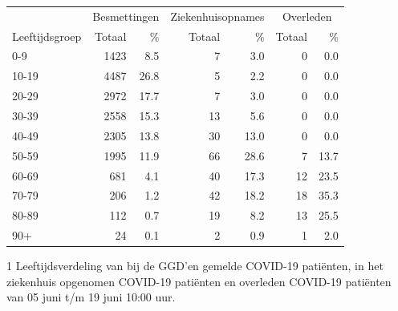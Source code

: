 \documentclass[
  english,
  man,floatsintext]{apa6}
\begin{document}
\begin{table}
\centering\begingroup\fontsize{11}{13}\selectfont

\begin{threeparttable}
\begin{tabular}{lrrrrrr}
\toprule
\multicolumn{1}{c}{ } & \multicolumn{2}{c}{Besmettingen} & \multicolumn{2}{c}{Ziekenhuisopnames} & \multicolumn{2}{c}{Overleden} \\
\cmidrule(l{3pt}r{3pt}){2-3} \cmidrule(l{3pt}r{3pt}){4-5} \cmidrule(l{3pt}r{3pt}){6-7}
Leeftijdsgroep & Totaal & \% & Totaal & \% & Totaal & \%\\
\midrule
0-9 & 1423 & 8.5 & 7 & 3.0 & 0 & 0.0\\
10-19 & 4487 & 26.8 & 5 & 2.2 & 0 & 0.0\\
20-29 & 2972 & 17.7 & 7 & 3.0 & 0 & 0.0\\
30-39 & 2558 & 15.3 & 13 & 5.6 & 0 & 0.0\\
40-49 & 2305 & 13.8 & 30 & 13.0 & 0 & 0.0\\
50-59 & 1995 & 11.9 & 66 & 28.6 & 7 & 13.7\\
60-69 & 681 & 4.1 & 40 & 17.3 & 12 & 23.5\\
70-79 & 206 & 1.2 & 42 & 18.2 & 18 & 35.3\\
80-89 & 112 & 0.7 & 19 & 8.2 & 13 & 25.5\\
90+ & 24 & 0.1 & 2 & 0.9 & 1 & 2.0\\
\bottomrule
\end{tabular}
\begin{tablenotes}
\item[1] Leeftijdsverdeling van bij de GGD’en gemelde COVID-19 patiënten, in het ziekenhuis opgenomen COVID-19 patiënten en overleden COVID-19 patiënten van 05 juni t/m 19 juni 10:00 uur.
\end{tablenotes}
\end{threeparttable}
\endgroup{}
\end{table}

\newpage
\end{document}
